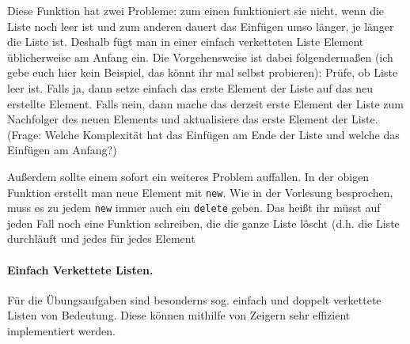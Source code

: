 \documentclass[
fontsize = 11pt,
paper    = a4,
BCOR     = 5mm,
DIV      = 12,
numbers  = noenddot,
]{scrartcl}
\begin{document}
Diese Funktion hat zwei Probleme: zum einen funktioniert sie nicht,
wenn die Liste noch leer ist und zum anderen dauert das Einfügen umso
länger, je länger die Liste ist. Deshalb fügt man in einer einfach
verketteten Liste Element üblicherweise am Anfang ein. Die
Vorgehensweise ist dabei folgendermaßen (ich gebe euch hier kein Beispiel, das
könnt ihr mal selbst probieren): Prüfe, ob Liste leer
ist. Falls ja, dann setze einfach das erste Element der Liste auf das
neu erstellte Element. Falls nein, dann mache das derzeit erste
Element der Liste zum Nachfolger des neuen Elements und aktualisiere
das erste Element der Liste. (Frage: Welche Komplexität hat das
Einfügen am Ende der Liste und welche das Einfügen am Anfang?)

Außerdem sollte einem sofort ein weiteres Problem auffallen. In der
obigen Funktion erstellt man neue Element mit \lstinline{new}. Wie in
der Vorlesung besprochen, muss es zu jedem \lstinline{new} immer auch
ein \lstinline{delete} geben. Das heißt ihr müsst auf jeden Fall noch
eine Funktion schreiben, die die ganze Liste löscht (d.h. die Liste
durchläuft und jedes für jedes Element\paragraph{Einfach Verkettete Listen.} Für die Übungsaufgaben sind
besonderns sog. einfach und doppelt verkettete Listen von
Bedeutung. Diese können mithilfe von Zeigern sehr effizient
implementiert werden.
\end{document}
